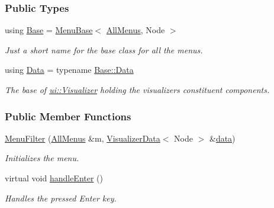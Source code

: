 \subsubsection*{Public Types}
\begin{DoxyCompactItemize}
\item 
using \hyperlink{structMenuFilter_a5b135342d678fdff56a3c8823fb74a33}{Base} = \hyperlink{structMenuBase}{Menu\+Base}$<$ \hyperlink{structAllMenus}{All\+Menus}, Node $>$\hypertarget{structMenuFilter_a5b135342d678fdff56a3c8823fb74a33}{}\label{structMenuFilter_a5b135342d678fdff56a3c8823fb74a33}

\begin{DoxyCompactList}\small\item\em Just a short name for the base class for all the menus. \end{DoxyCompactList}\item 
using \hyperlink{structMenuFilter_af43a040049db3467e63e871a090573a8}{Data} = typename \hyperlink{structMenuBase_a473a45fd8adbc75a9220b64753ae3837}{Base\+::\+Data}\hypertarget{structMenuFilter_af43a040049db3467e63e871a090573a8}{}\label{structMenuFilter_af43a040049db3467e63e871a090573a8}

\begin{DoxyCompactList}\small\item\em The base of \hyperlink{structui_1_1Visualizer}{ui\+::\+Visualizer} holding the visualizer\textquotesingle{}s constituent components. \end{DoxyCompactList}\end{DoxyCompactItemize}
\subsubsection*{Public Member Functions}
\begin{DoxyCompactItemize}
\item 
\hyperlink{structMenuFilter_abdaf4bcc362faa3b6532fd69a574b7ee}{Menu\+Filter} (\hyperlink{structAllMenus}{All\+Menus} \&m, \hyperlink{structVisualizerData}{Visualizer\+Data}$<$ Node $>$ \&\hyperlink{structMenuBase_a819aaaa06ede3bffbb12c1390657ef64}{data})
\begin{DoxyCompactList}\small\item\em Initializes the menu. \end{DoxyCompactList}\item 
virtual void \hyperlink{structMenuFilter_ada48e7281e0edd031e8a21a308bc959e}{handle\+Enter} ()\hypertarget{structMenuFilter_ada48e7281e0edd031e8a21a308bc959e}{}\label{structMenuFilter_ada48e7281e0edd031e8a21a308bc959e}

\begin{DoxyCompactList}\small\item\em Handles the pressed Enter key. \end{DoxyCompactList}\end{DoxyCompactItemize}
